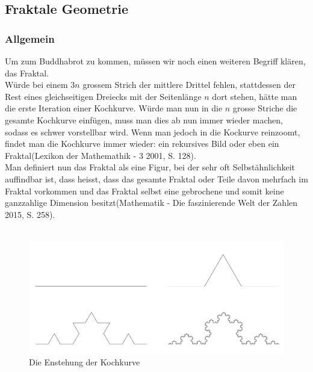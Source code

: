 \subsection{Fraktale Geometrie}
\subsubsection{Allgemein}
Um zum Buddhabrot zu kommen, müssen wir noch einen weiteren Begriff klären, das Fraktal.\\ Würde bei einem 3$n$ grossem Strich der mittlere Drittel fehlen, stattdessen der Rest eines gleichseitigen Dreiecks mit der Seitenlänge $n$ dort stehen, hätte man die erste Iteration einer Kochkurve. Würde man nun in die $n$ grosse Striche die gesamte Kochkurve einfügen, muss man dies ab nun immer wieder machen, sodass es schwer vorstellbar wird. Wenn man jedoch in die Kockurve reinzoomt, findet man die Kochkurve immer wieder: ein rekursives Bild oder eben ein Fraktal(Lexikon der Mathemathik - 3 2001, S. 128).\\Man definiert nun das Fraktal als eine Figur, bei der sehr oft Selbstähnlichkeit auffindbar ist, dass heisst, dass das gesamte Fraktal oder Teile davon mehrfach im Fraktal vorkommen und das Fraktal selbst eine gebrochene und somit keine ganzzahlige Dimension besitzt(Mathematik - Die faszinierende Welt der Zahlen 2015, S. 258).\\
\\

\begin{figure}[h]
    \centering
    \includegraphics[width=.5\textwidth]{Pictures/Kochkurve.png}
    \caption{Die Enstehung der Kochkurve}
    \label{fig:Kochkurve}
\end{figure}

